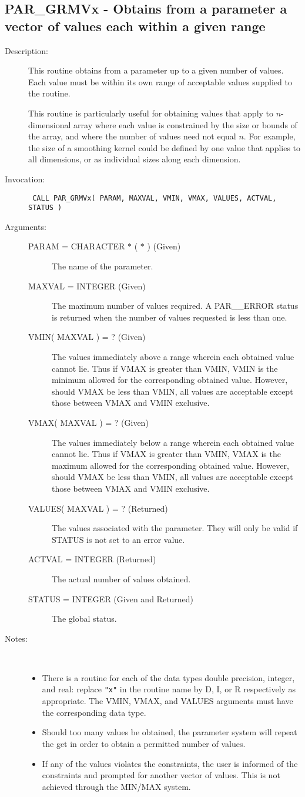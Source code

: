 \documentclass[twoside,11pt]{article}
\newcommand{\xlabel}[1]{}
\newlength{\sstbannerlength}
\newlength{\sstcaptionlength}
\newlength{\sstexampleslength}
\newlength{\sstexampleswidth}
\newcommand{\sstroutine}[3]{
   \goodbreak
   \rule{\textwidth}{0.5mm}
   \vspace{-7ex}
   \newline
   \settowidth{\sstbannerlength}{{\Large {\bf #1}}}
   \setlength{\sstcaptionlength}{\textwidth}
   \setlength{\sstexampleslength}{\textwidth}
   \addtolength{\sstbannerlength}{0.5em}
   \addtolength{\sstcaptionlength}{-2.0\sstbannerlength}
   \addtolength{\sstcaptionlength}{-5.0pt}
   \settowidth{\sstexampleswidth}{{\bf Examples:}}
   \addtolength{\sstexampleslength}{-\sstexampleswidth}
   \parbox[t]{\sstbannerlength}{\flushleft{\Large {\bf #1}}}
   \parbox[t]{\sstcaptionlength}{\center{\Large #2}}
   \parbox[t]{\sstbannerlength}{\flushright{\Large {\bf #1}}}
   \begin{description}
      #3
   \end{description}
}
\newcommand{\sstdescription}[1]{\item[Description:] #1}
\newcommand{\sstinvocation}[1]{\item[Invocation:]\hspace{0.4em}{\tt #1}}
\newcommand{\sstarguments}[1]{
   \item[Arguments:] \mbox{} \\
   \vspace{-3.5ex}
   \begin{description}
      #1
   \end{description}
}
\newcommand{\sstsubsection}[1]{ \item[{#1}] \mbox{} \\}
\newcommand{\sstnotes}[1]{\item[Notes:] \mbox{} \\[1.3ex] #1}
\newcommand{\sstitemlist}[1]{
  \mbox{} \\
  \vspace{-7ex}
  \begin{itemize}
     #1
  \end{itemize}
}
\newcommand{\sstitem}{\item}
\newcommand{\ssttt}{\tt}
\renewcommand{\sstroutine}[3]{
      \subsection{\xlabel{12}#1\xlabel{#1}-\label{#1}#2}
      \begin{description}
         #3
      \end{description}
   }
\renewcommand{\sstdescription}[1]{\item[Description:]
      \begin{description}
         #1
      \end{description}
   }
\renewcommand{\sstinvocation}[1]{\item[Invocation:]
      \begin{description}
         {\ssttt #1}
      \end{description}
   }
\renewcommand{\sstarguments}[1]{
      \item[Arguments:]
      \begin{description}
         #1
      \end{description}
   }
\renewcommand{\sstsubsection}[1]{\item[{#1}]}
\renewcommand{\sstnotes}[1]{\item[Notes:]
      \begin{description}
         #1
      \end{description}
   }
\newcommand{\sstitemlist}[1]{
      \begin{itemize}
         #1
      \end{itemize}
   }
\begin{document}
\sstroutine{
   PAR\_GRMVx
}{
   Obtains from a parameter a vector of values each within a given
   range
}{
   \sstdescription{
      This routine obtains from a parameter up to a given number of
      values.  Each value must be within its own range of acceptable
      values supplied to the routine.

      This routine is particularly useful for obtaining values that
      apply to $n$-dimensional array where each value is constrained by
      the size or bounds of the array, and where the number of values
      need not equal $n$.  For example, the size of a smoothing kernel
      could be defined by one value that applies to all dimensions, or
      as individual sizes along each dimension.
   }
   \sstinvocation{
      CALL PAR\_GRMVx( PARAM, MAXVAL, VMIN, VMAX, VALUES, ACTVAL,
                      STATUS )
   }
   \sstarguments{
      \sstsubsection{
         PARAM = CHARACTER $*$ ( $*$ ) (Given)
      }{
         The name of the parameter.
      }
      \sstsubsection{
         MAXVAL = INTEGER (Given)
      }{
         The maximum number of values required.  A PAR\_\_ERROR status is
         returned when the number of values requested is less than one.
      }
      \sstsubsection{
         VMIN( MAXVAL ) = ? (Given)
      }{
        The values immediately above a range wherein each obtained
         value cannot lie.  Thus if VMAX is greater than VMIN, VMIN
         is the minimum allowed for the corresponding obtained value.
         However, should VMAX be less than VMIN, all values are
         acceptable except those between VMAX and VMIN exclusive.
      }
      \sstsubsection{
         VMAX( MAXVAL ) = ? (Given)
      }{
         The values immediately below a range wherein each obtained
         value cannot lie.  Thus if VMAX is greater than VMIN, VMAX
         is the maximum allowed for the corresponding obtained value.
         However, should VMAX be less than VMIN, all values are
         acceptable except those between VMAX and VMIN exclusive.
      }
      \sstsubsection{
         VALUES( MAXVAL ) = ? (Returned)
      }{
         The values associated with the parameter.  They will only be
         valid if STATUS is not set to an error value.
      }
      \sstsubsection{
         ACTVAL = INTEGER (Returned)
      }{
         The actual number of values obtained.
      }
      \sstsubsection{
         STATUS = INTEGER (Given and Returned)
      }{
         The global status.
      }
   }
   \sstnotes{
      \sstitemlist{

         \sstitem
         There is a routine for each of the data types double precision,
         integer, and real: replace {\tt "x"} in the routine name by D, I, or R
         respectively as appropriate.  The VMIN, VMAX, and VALUES
         arguments must have the corresponding data type.

         \sstitem
         Should too many values be obtained, the parameter system will
         repeat the get in order to obtain a permitted number of values.

         \sstitem
         If any of the values violates the constraints, the user is
         informed of the constraints and prompted for another vector of
         values.  This is not achieved through the MIN/MAX system.
      }
   }
}
\end{document}
